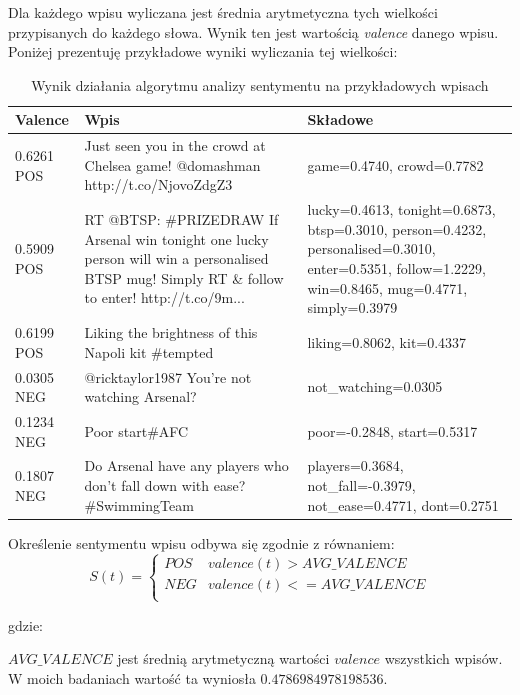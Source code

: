 Dla każdego wpisu wyliczana jest średnia arytmetyczna tych
wielkości przypisanych do każdego słowa. Wynik ten jest wartością
\textit{valence} danego wpisu. Poniżej prezentuję przykładowe wyniki wyliczania
tej wielkości:
\clearpage
\begin{table}[ht!]  
\begin{center}  
\begin{tabular}{|p{12mm}|p{70mm}|>{\raggedright\arraybackslash}p{60mm}|}
\hline
Valence & Wpis & Składowe 
\\ \hline 
0.6261 POS & Just seen you in the crowd at Chelsea game! @domashman http://t.co/NjovoZdgZ3 & {game=0.4740, crowd=0.7782}
\\ \hline
0.5909 POS & RT @BTSP: \#PRIZEDRAW If Arsenal win tonight one lucky person
will win a personalised BTSP mug! Simply RT \& follow to enter!
http://t.co/9m... & {lucky=0.4613, tonight=0.6873, btsp=0.3010, person=0.4232, personalised=0.3010, enter=0.5351, follow=1.2229, win=0.8465, mug=0.4771, simply=0.3979}
\\ \hline
0.6199 POS & Liking the brightness of this Napoli kit \#tempted &
{liking=0.8062, kit=0.4337} \\ \hline
0.0305 NEG & @ricktaylor1987 You're not watching Arsenal? &
{not\_watching=0.0305} \\ \hline
0.1234 NEG & Poor start\#AFC & {poor=-0.2848, start=0.5317}
\\ \hline
0.1807 NEG & Do Arsenal have any players who don't fall down with ease?
\#SwimmingTeam & {players=0.3684, not\_fall=-0.3979, not\_ease=0.4771,
dont=0.2751} \\ \hline
\end{tabular} 
\end{center} 
\caption{Wynik działania algorytmu analizy sentymentu na przykładowych wpisach}
\end{table}

Określenie sentymentu wpisu odbywa się zgodnie z równaniem:
\begin{equation}
S(t) =
\begin{cases}
POS & valence(t) > AVG\_VALENCE \\
NEG & valence(t) <= AVG\_VALENCE \\
\end{cases}
\end{equation}

gdzie:

$AVG\_VALENCE$ jest średnią arytmetyczną wartości $valence$
wszystkich wpisów. W moich badaniach wartość ta wyniosła $0.4786984978198536$.

